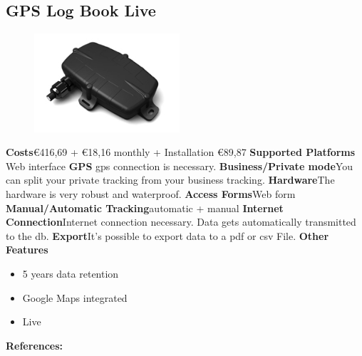 \begin{singlespace}
\section{GPS Log Book Live}
\begin{figure}
  \begin{center}
    \includegraphics[width=0.48\textwidth]{bilder/GPSlogbooklive!}
  \end{center}
\end{figure}
\textbf{Costs}\euro 416,69 + \euro 18,16 monthly + Installation \euro 89,87 
\newline\newline
\textbf{Supported Platforms} Web interface
\newline\newline
\textbf{GPS} \gls{gps} connection is necessary.
\newline\newline
\textbf{Business/Private mode}You can split your private tracking from your business tracking.
\newline\newline
\textbf{Hardware}The hardware is very robust and waterproof.
\newline\newline
\textbf{Access Forms}Web form
\newline\newline
\textbf{Manual/Automatic Tracking}automatic + manual
\newline\newline
\textbf{Internet Connection}Internet connection necessary.
Data gets automatically  transmitted to the \gls{db}.
\newline\newline
\textbf{Export}It’s possible to export data to a \gls{pdf} or \gls{csv} File.
\newline\newline
\textbf{Other Features}
\begin{itemize}
\item 5 years data retention  
\item Google Maps integrated
\item Live
\end{itemize}
\textbf{References:} \cite{GPS_Log_Book_LIVE}
\newpage
\clearpageauthor

\end{singlespace}
